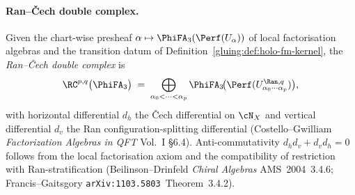 \paragraph{Ran--\v{C}ech double complex.} Given the chart-wise
presheaf $\alpha\mapsto\PhiFA_{3}(\Perf(U_{\alpha}))$ of local
factorisation algebras and the transition datum of
Definition~\ref{gluing:def:holo-fm-kernel}, the
\emph{Ran--\v{C}ech double complex} is
\[
\RC^{p,q}\bigl(\PhiFA_{3}\bigr)\;=\;
\bigoplus_{\alpha_{0}<\cdots<\alpha_{p}}
\PhiFA_{3}\!\bigl(\Perf(U_{\alpha_{0}\cdots\alpha_{p}}^{\Ran,q})\bigr),
\]
with horizontal differential $d_{h}$ the \v{C}ech differential on
$\cN_{X}$ and vertical differential $d_{v}$ the Ran
configuration-splitting differential (Costello--Gwilliam
\emph{Factorization Algebras in QFT} Vol.~I \S 6.4).
Anti-commutativity $d_{h}d_{v}+d_{v}d_{h}=0$ follows from the local
factorisation axiom and the compatibility of restriction with
Ran-stratification (Beilinson--Drinfeld \emph{Chiral Algebras}
AMS~2004~3.4.6; Francis--Gaitsgory
\texttt{arXiv:1103.5803}~Theorem~3.4.2).

